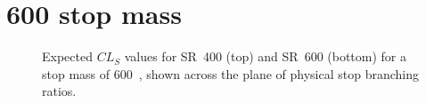\FloatBarrier

\newpage
\section{600 \texorpdfstring{\GeV}{GeV} stop mass}

\begin{figure}[ht]
  \centering
  \caption{
    Expected
    $CL_S$ values for SR~400 (top) and SR~600 (bottom) for a stop mass of
    600~\GeV,
    shown across the plane of physical stop branching ratios.
  }
\end{figure}


